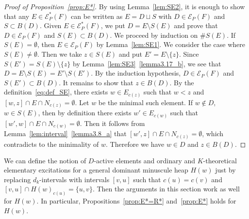 \documentclass[ALCO,ThmDefs,Unicode,epreuves]{cedram}
\newcommand\EE{\mathcal{E}}
\begin{document}
\begin{proof}[Proof of Proposition~\ref{prop:E*}]
By using Lemma~\ref{lem:SE2}, it is enough to show that any $E \in \EE^*_P(F)$ 
can be written as $E = D \sqcup S$ with $D \in \EE_P(F)$ and $S \subset B(D)$.
Given $E \in \EE^*_P(F)$, we put $D = E \setminus S(E)$ and prove that 
$D \in \EE_P(F)$ and $S(E) \subset B(D)$.
We proceed by induction on $\# S(E)$.
If $S(E) = \emptyset$, then $E \in \EE_P(F)$ by Lemma~\ref{lem:SE1}.
We consider the case where $S(E) \neq \emptyset$.
Then we take $z \in S(E)$ and put $E' = E \setminus \{ z \}$.
Since $S(E') = S(E) \setminus \{ z \}$ by Lemma~\ref{lem:SE3}~\ref{lemma3.17_b}, 
we see that $D = E \setminus S(E) = E' \setminus S(E')$.
By the induction hypothesis, $D \in \EE_P(F)$ and $S(E') \subset B(D)$.
It remains to show that $z \in B(D)$.
By the definition~\eqref{eq:def_SE}, 
there exists $w \in E_{c(z)}$ such that $w<z$ and $[w,z] \cap E \cap N_{c(z)} = \emptyset$.
Let $w$ be the minimal such element.
If $w \not\in D$, $w \in S(E)$, 
then by definition there exists $w' \in E_{c(w)}$ such that $[w',w] \cap E \cap N_{c(w)} = \emptyset$.
Then it follows from Lemma~\ref{lem:interval}~\ref{lemma3.8_a} that $[w',z] \cap E \cap N_{c(z)} = \emptyset$, 
which contradicts to the minimality of $w$.
Therefore we have $w \in D$ and $z \in B(D)$.
\end{proof}

\begin{rema}
\label{rem:heap2}
We can define the notion of $D$-active elements and ordinary and $K$-theoretical elementary excitations 
for a general dominant minuscule heap $H(w)$ just by replacing $d_k$-intervals with 
intervals $[v,u]$ such that $c(u) = c(v)$ and $[v,u] \cap H(w)_{c(u)} = \{ u, v \}$.
Then the arguments in this section work as well for $H(w)$.
In particular, Propositions~\ref{prop:E*=R*} and~\ref{prop:E*} holds for $H(w)$.
\end{rema}
\end{document}
